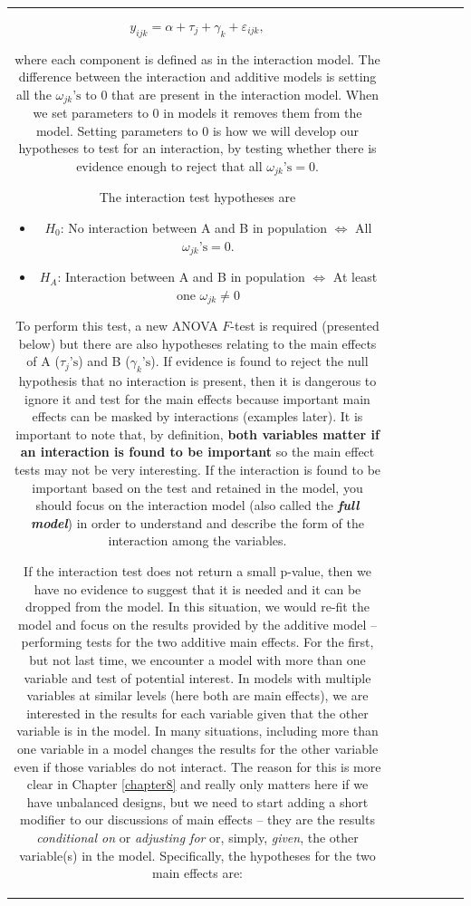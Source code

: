 \documentclass[]{book}
\theoremstyle{definition}
\theoremstyle{definition}
\theoremstyle{remark}
\begin{document}
\begin{longtable}[]{@{}ccccccc@{}}
\begin{minipage}[b]{0.10\columnwidth}
\[y_{ijk} = \alpha + \tau_j + \gamma_k + \varepsilon_{ijk},\]

where each component is defined as in the interaction model. The
difference between the interaction and additive models is setting all
the \(\omega_{jk}\text{'s}\) to 0 that are present in the interaction
model. When we set parameters to 0 in models it removes them from the
model. Setting parameters to 0 is how we will develop our hypotheses to
test for an interaction, by testing whether there is evidence enough to
reject that all \(\omega_{jk}\text{'s}=0\).

The interaction test hypotheses are

\begin{itemize}
\item
  \(H_0\): No interaction between A and B in population
  \(\Leftrightarrow\) All \(\omega_{jk}\text{'s}=0\).
\item
  \(H_A\): Interaction between A and B in population \(\Leftrightarrow\)
  At least one \(\omega_{jk}\ne 0\)
\end{itemize}

To perform this test, a new ANOVA \(F\)-test is required (presented
below) but there are also hypotheses relating to the main effects of A
(\(\tau_j\text{'s}\)) and B (\(\gamma_k\text{'s}\)). If evidence is
found to reject the null hypothesis that no interaction is present, then
it is dangerous to ignore it and test for the main effects because
important main effects can be masked by interactions (examples later).
It is important to note that, by definition, \textbf{both variables
matter if an interaction is found to be important} so the main effect
tests may not be very interesting. If the interaction is found to be
important based on the test and retained in the model, you should focus
on the interaction model (also called the \textbf{\emph{full model}}) in
order to understand and describe the form of the interaction among the
variables.

If the interaction test does not return a small p-value, then we have no
evidence to suggest that it is needed and it can be dropped from the
model. In this situation, we would re-fit the model and focus on the
results provided by the additive model -- performing tests for the two
additive main effects. For the first, but not last time, we encounter a
model with more than one variable and test of potential interest. In
models with multiple variables at similar levels (here both are main
effects), we are interested in the results for each variable given that
the other variable is in the model. In many situations, including more
than one variable in a model changes the results for the other variable
even if those variables do not interact. The reason for this is more
clear in Chapter \ref{chapter8} and really only matters here if we have
unbalanced designs, but we need to start adding a short modifier to our
discussions of main effects -- they are the results \emph{conditional
on} or \emph{adjusting for} or, simply, \emph{given}, the other
variable(s) in the model. Specifically, the hypotheses for the two main
effects are:


\end{minipage}
\end{longtable}
\end{document}
